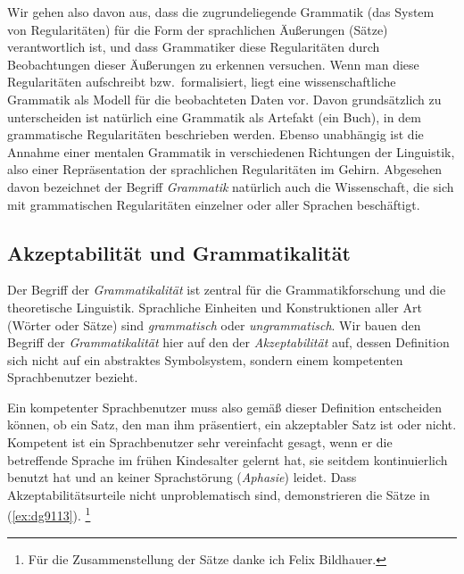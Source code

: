 
Wir gehen also davon aus, dass die zugrundeliegende Grammatik (das System von Regularitäten) für die Form der sprachlichen Äußerungen (\zB Sätze) verantwortlich ist, und dass Grammatiker diese Regularitäten durch Beobachtungen dieser Äußerungen zu erkennen versuchen.
Wenn man diese Regularitäten aufschreibt bzw.\ formalisiert, liegt eine wissenschaftliche Grammatik als Modell für die beobachteten Daten vor.
Davon grundsätzlich zu unterscheiden ist natürlich eine Grammatik als Artefakt (\zB ein Buch), in dem grammatische Regularitäten beschrieben werden.
Ebenso unabhängig ist die Annahme einer mentalen Grammatik in verschiedenen Richtungen der Linguistik, also einer Repräsentation der sprachlichen Regularitäten im Gehirn.
Abgesehen davon bezeichnet der Begriff \textit{Grammatik} natürlich auch die Wissenschaft, die sich mit grammatischen Regularitäten einzelner oder aller Sprachen beschäftigt.

\subsection{Akzeptabilität und Grammatikalität}

\label{sec:akzeptabilitaetgrammatikalitaet}


Der Begriff der \textit{Grammatikalität} ist zentral für die Grammatikforschung und die theoretische Linguistik.
Sprachliche Einheiten und Konstruktionen aller Art (\zB Wörter oder Sätze) sind \textit{grammatisch} oder \textit{ungrammatisch}.
Wir bauen den Begriff der \textit{Grammatikalität} hier auf den der \textit{Akzeptabilität} auf, dessen Definition sich nicht auf ein abstraktes Symbolsystem, sondern einem kompetenten Sprachbenutzer bezieht.


Ein kompetenter Sprachbenutzer muss also gemäß dieser Definition entscheiden können, ob ein Satz, den man ihm präsentiert, ein akzeptabler Satz ist oder nicht.
Kompetent ist ein Sprachbenutzer sehr vereinfacht gesagt, wenn er die betreffende Sprache im frühen Kindesalter gelernt hat, sie seitdem kontinuierlich benutzt hat und an keiner Sprachstörung (\textit{Aphasie}) leidet.
Dass Akzeptabilitätsurteile nicht unproblematisch sind, demonstrieren die Sätze in (\ref{ex:dg9113}).%
\footnote{Für die Zusammenstellung der Sätze danke ich Felix Bildhauer.}

